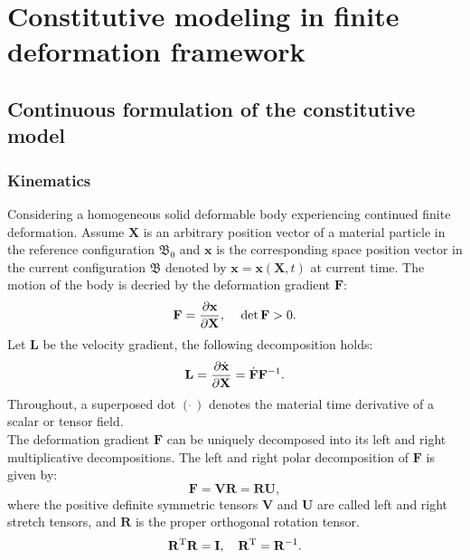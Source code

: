 \chapter{Constitutive modeling in finite deformation framework}

\section{Continuous formulation of the constitutive model}
\subsection{Kinematics}
\noindent
Considering a homogeneous solid deformable body experiencing continued finite deformation.
Assume $\mathbf{X}$ is an arbitrary position vector of a material particle in the reference configuration $\mathfrak{B_0}$ and $\mathbf{x}$ is the corresponding space position vector in the current configuration $\mathfrak{B}$ denoted by $\mathbf{x}=\mathbf{x}\left(\mathbf{X},t\right)$ at current time.
The motion of the body is decried by the deformation gradient $\mathbf{F}$:
\begin{equation}
{\mathbf{F}} = \frac{{\partial {\mathbf{x}}}}{{\partial {\mathbf{X}}}}, \rm{\quad} \det {\mathbf{F}}>0.
\end{equation}
Let $\mathbf{L}$ be the velocity gradient, the following decomposition holds:
\begin{equation}
{\mathbf{L}} = \frac{{\partial {\dot {\bf{x}}}}}{{\partial {\mathbf{X}}}} = {\dot {\bf{F}}}{{\mathbf{F}}^{ - 1}}.
\end{equation}
Throughout, a superposed dot $\left(\dot{\ }\right)$ denotes the material time derivative of a scalar or tensor field.\\
The deformation gradient $\mathbf{F}$ can be uniquely decomposed into its left and right multiplicative decompositions.
The left and right polar decomposition of $\mathbf{F}$ is given by:
\begin{equation}
{\mathbf{F}} = {\mathbf{VR}} = {\mathbf{RU}},
\end{equation}
where the positive definite symmetric tensors $\mathbf{V}$ and $\mathbf{U}$ are called left and right stretch tensors, and $\mathbf{R}$ is the proper orthogonal rotation tensor.
\begin{equation}
{{\mathbf{R}}^{\rm{T}}} {\mathbf{R}} = {\mathbf{I}}, \rm{\quad} {{\mathbf{R}}^{\rm{T}}} = {{\mathbf{R}}^{ - 1}}.
\end{equation}
